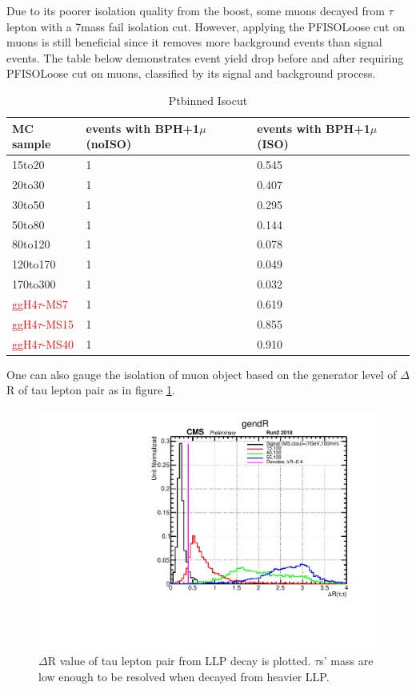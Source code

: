 Due to its poorer isolation quality from the boost, some muons decayed from $\tau$ lepton with a 7\GeV mass fail isolation cut.
However, applying the PFISOLoose cut on muons is still beneficial since it removes more background events than signal events.
The table below demonstrates event yield drop before and after requiring PFISOLoose cut on muons, classified by its signal and background process.


\begin{tiny}
    \begin{table}
  \centering
\begin{tabular}{|p{3cm}|p{2cm}|p{2cm}|}
\hline
MC sample & events with BPH+1$\mu$ (noISO) & events with BPH+1$\mu$ (ISO) \\
\hline
 15to20 & 1 & 0.545 \\
 \hline
 20to30 & 1 & 0.407 \\
\hline
 30to50 & 1 & 0.295 \\
\hline
 50to80 & 1 & 0.144 \\
\hline
 80to120 & 1 & 0.078 \\
\hline
120to170 & 1 & 0.049 \\
\hline
170to300 & 1 & 0.032 \\
\hline
\textcolor{red}{ggH4$\tau$-MS7}& 1 & 0.619 \\
\hline
\textcolor{red}{ggH4$\tau$-MS15} & 1 & 0.855 \\
\hline
\textcolor{red}{ggH4$\tau$-MS40} & 1 & 0.910 \\
 \hline
    \end{tabular}
    \caption{Ptbinned Isocut}
    \end{table}
\end{tiny}    

One can also gauge the isolation of muon object based on the generator level of $\Delta$R of tau lepton pair as in figure \ref{fig:taudeltaR}.
 \begin{figure}[h!]
   \caption{$\Delta$R value of tau lepton pair from LLP decay is plotted. $\tau$s' mass are low enough to be resolved when decayed from heavier LLP.}
   \label{fig:taudeltaR}
   \centering
   \includegraphics[width=0.60\linewidth]{figs/taugendR.pdf}
 \end{figure}





